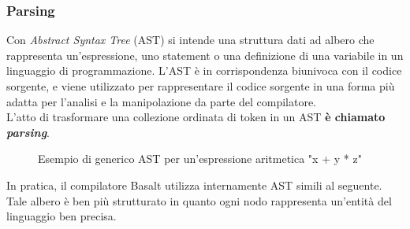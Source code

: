 \subsubsection{Parsing}
Con \textit{Abstract Syntax Tree} (AST) si intende una struttura dati ad albero che 
rappresenta un'espressione, uno statement o una definizione 
di una variabile in un linguaggio di programmazione. L'AST è in corrispondenza 
biunivoca con il codice sorgente, e viene utilizzato
per rappresentare il codice sorgente in una forma più adatta per l'analisi 
e la manipolazione da parte del compilatore. \\

L'atto di trasformare una collezione ordinata di token in un AST \textbf{è chiamato \textit{parsing}}.

\begin{figure}[H]
    \centering
    \caption{Esempio di generico AST per un'espressione aritmetica "x + y * z"} 
\end{figure}
\newpage

In pratica, il compilatore Basalt utilizza internamente AST simili al seguente. Tale albero è 
ben più strutturato in quanto ogni nodo rappresenta un'entità del linguaggio ben precisa.

